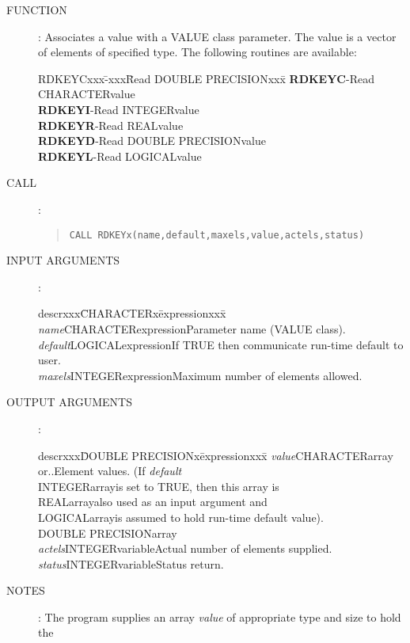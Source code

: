 \documentclass{article}
\begin{document}
\begin{description}
\item [FUNCTION]:
Associates a value with a VALUE class parameter.
The value is a vector of elements of specified type.
The following routines are available:
\begin{center}
\begin{tabbing}
RDKEYCxxx\=-xxx\=Read DOUBLE PRECISIONxxx\=\kill
{\bf RDKEYC}\>-\>Read CHARACTER\>value\\
{\bf RDKEYI}\>-\>Read INTEGER\>value\\
{\bf RDKEYR}\>-\>Read REAL\>value\\
{\bf RDKEYD}\>-\>Read DOUBLE PRECISION\>value\\
{\bf RDKEYL}\>-\>Read LOGICAL\>value
\end{tabbing}
\end{center}
\item [CALL]:
\begin{quote}
{\tt CALL RDKEYx(name,default,maxels,value,actels,status)}
\end{quote}
\item [INPUT ARGUMENTS]:
\begin{tabbing}
descrxxx\=CHARACTERx\=expressionxxx\=\kill
{\em name}\>CHARACTER\>expression\>Parameter name (VALUE class).\\
{\em default}\>LOGICAL\>expression\>If TRUE then communicate run-time default to user.\\
{\em maxels}\>INTEGER\>expression\>Maximum number of elements allowed.
\end{tabbing}
\item [OUTPUT ARGUMENTS]:
\begin{tabbing}
descrxxx\=DOUBLE PRECISIONx\=expressionxxx\=\kill
{\em value}\>CHARACTER\>array or..\>Element values.  (If {\em default}\\
\>INTEGER\>array\>is set to TRUE, then this array is\\
\>REAL\>array\>also used as an input argument and\\
\>LOGICAL\>array\>is assumed to hold run-time default value).\\
\>DOUBLE PRECISION\>array\\
{\em actels}\>INTEGER\>variable\>Actual number of elements supplied.\\
{\em status}\>INTEGER\>variable\>Status return.
\end{tabbing}
\item [NOTES]:
The program supplies an array {\em value} of appropriate type and size to hold the

\end{description}
\end{document}
